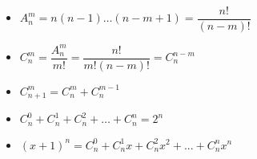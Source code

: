 \documentclass[E:/GsjzTle/main/main.tex]{subfiles}
\begin{document}
\begin{itemize}
\item
  \(A_{n}^{m}=n\left( n-1\right) \ldots \left( n-m+1\right) =\dfrac{n!}{\left( n-m\right) !}\)
\item
  \(C_{n}^{m}=\dfrac{A_{n}^{m}}{m!}=\dfrac{n!}{m!\left( n-m\right) !}=C_{n}^{n-m}\)
\item
  \(C_{n+1}^{m}=C_{n}^{m}+C_{n}^{m-1}\)
\item
  \(C_{n}^{0}+C_{n}^{1}+C_{n}^{2}+\ldots +C_{n}^{n}=2^{n}\)
\item
  \((x+1)^n=C^{0}_{n}+C^{1}_{n}x+C^{2}_{n}x^2+...+C^{n}_{n}x^n\)
\end{itemize}
\end{document}
